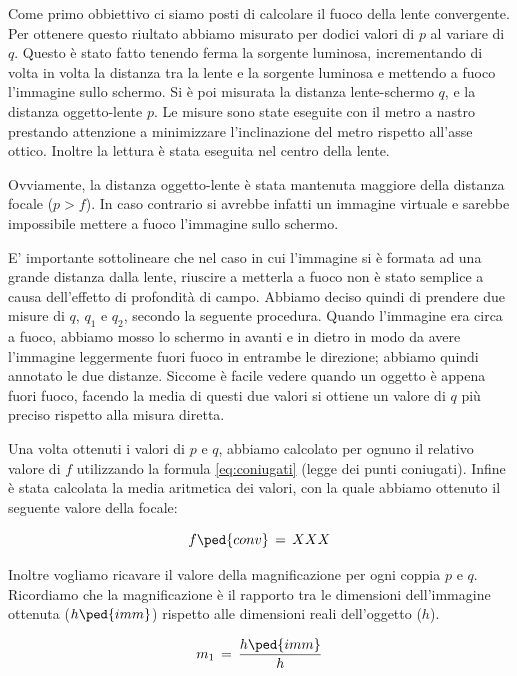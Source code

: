 Come primo obbiettivo ci siamo posti di calcolare il fuoco della lente convergente. Per ottenere questo riultato abbiamo misurato per dodici valori di $p$ al variare di $q$. Questo è stato fatto tenendo ferma la sorgente luminosa, incrementando di volta in volta la distanza tra la lente e la sorgente luminosa e mettendo a fuoco l'immagine sullo schermo. Si è poi misurata la distanza lente-schermo $q$, e la distanza oggetto-lente $p$. Le misure sono state eseguite con il metro a nastro prestando attenzione a minimizzare l'inclinazione del metro rispetto all'asse ottico. Inoltre la lettura è stata eseguita nel centro della lente.

Ovviamente, la distanza oggetto-lente è stata mantenuta maggiore della distanza focale ($p > f$). In caso contrario si avrebbe infatti un immagine virtuale e sarebbe impossibile mettere a fuoco l'immagine sullo schermo.

E' importante sottolineare che nel caso in cui l'immagine si è formata ad una grande distanza dalla lente, riuscire a metterla a fuoco non è stato semplice a causa dell'effetto di profondità di campo. Abbiamo deciso quindi di prendere due misure di $q$, $q_1$ e $q_2$, secondo la seguente procedura. Quando l'immagine era circa a fuoco, abbiamo mosso lo schermo in avanti e in dietro in modo da avere l'immagine leggermente fuori fuoco in entrambe le direzione; abbiamo quindi annotato le due distanze. Siccome è facile vedere quando un oggetto è appena fuori fuoco, facendo la media di questi due valori si ottiene un valore di $q$ più preciso rispetto alla misura diretta.

Una volta ottenuti i valori  di $p$ e $q$, abbiamo calcolato per ognuno il relativo valore di $f$ utilizzando la formula \ref{eq:coniugati} (legge dei punti coniugati). Infine è stata calcolata la media aritmetica dei valori, con la quale abbiamo ottenuto il seguente valore della focale:

\begin{equation}
	f \ped{conv} \,=\, XXX
\end{equation}

Inoltre vogliamo ricavare il valore della magnificazione per ogni coppia $p$ e $q$. Ricordiamo che la magnificazione è il rapporto tra le dimensioni dell'immagine ottenuta ($h \ped{imm}$) rispetto alle dimensioni reali dell'oggetto ($h$).

\begin{equation}
	m_{1} \,=\, \frac{h \ped{imm}}{h}
\end{equation}

